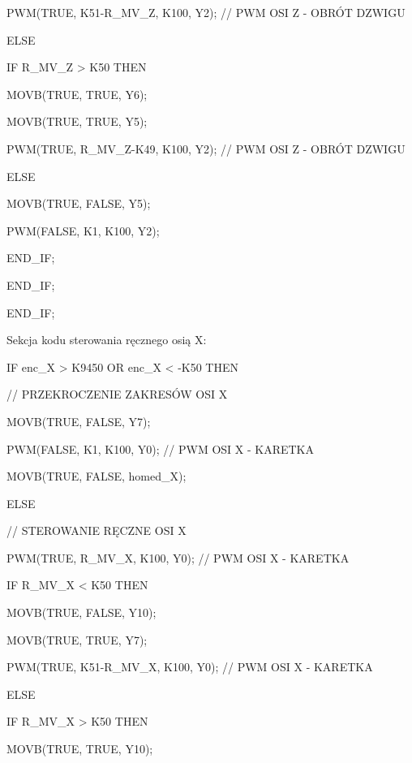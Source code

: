 \documentclass{mwrep}
\begin{document}
\quad \quad \quad PWM(TRUE, K51-R\_MV\_Z, K100, Y2); 	// PWM OSI Z - OBRÓT DZWIGU	

\quad \quad \quad ELSE 

\quad \quad \quad IF R\_MV\_Z > K50 THEN

\quad \quad \quad \quad MOVB(TRUE, TRUE, Y6);

\quad \quad \quad \quad MOVB(TRUE, TRUE, Y5);

\quad \quad \quad \quad PWM(TRUE, R\_MV\_Z-K49, K100, Y2); // PWM OSI Z - OBRÓT DZWIGU

\quad \quad \quad \quad ELSE

\quad \quad \quad \quad MOVB(TRUE, FALSE, Y5);

\quad \quad \quad \quad PWM(FALSE, K1, K100, Y2); 

\quad \quad \quad END\_IF;

\quad \quad END\_IF;

\quad END\_IF;

\vspace{1cm}

Sekcja kodu sterowania ręcznego osią X:

\vspace{0.3cm}

\quad IF enc\_X > K9450 OR enc\_X < -K50 THEN

\quad \quad // PRZEKROCZENIE ZAKRESÓW OSI X

\quad \quad MOVB(TRUE, FALSE, Y7);

\quad \quad PWM(FALSE, K1, K100, Y0); // PWM OSI X - KARETKA

\quad \quad MOVB(TRUE, FALSE, homed\_X);

\quad \quad ELSE\quad 

\quad \quad // STEROWANIE RĘCZNE OSI X\quad 

\quad \quad PWM(TRUE, R\_MV\_X, K100, Y0); // PWM OSI X - KARETKA\quad \quad 

\quad \quad \quad 

\quad \quad IF R\_MV\_X < K50 THEN

\quad \quad MOVB(TRUE, FALSE, Y10);

\quad \quad \quad MOVB(TRUE, TRUE, Y7);

\quad \quad \quad PWM(TRUE, K51-R\_MV\_X, K100, Y0); // PWM OSI X - KARETKA\quad \quad 

\quad \quad \quad ELSE 

\quad \quad \quad IF R\_MV\_X > K50 THEN

\quad \quad \quad \quad MOVB(TRUE, TRUE, Y10);
\end{document}
